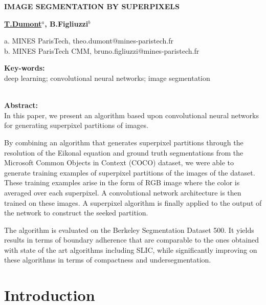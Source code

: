 \documentclass{article}
\begin{document}
\begin{center}
    \begin{Large}\textbf{IMAGE SEGMENTATION BY SUPERPIXELS}\end{Large}

    \vspace{1cm}
    \begin{large}\textbf{\underline{T.Dumont$^a$}, B.Figliuzzi$^b$}\end{large}

    \vspace{0.5cm}
    a. MINES ParisTech, theo.dumont@mines-paristech.fr\\
    b. MINES ParisTech CMM, bruno.figliuzzi@mines-paristech.fr
    \vspace{1cm}
\end{center}

\begin{center}

\noindent\textbf{Key-words: }\\
deep learning; convolutional neural networks; image segmentation\\
\ \\
\end{center}
\textbf{Abstract: }\\
In this paper, we present an algorithm based upon convolutional neural networks for generating superpixel partitions of images.
\par
By combining an algorithm that generates superpixel partitions through the resolution of the Eikonal equation and ground truth segmentations from the Microsoft Common Objects in Context (COCO) dataset, we were able to generate training examples of superpixel partitions of the images of the dataset. These training examples arise in the form of RGB image where the color is averaged over each superpixel. A convolutional network architecture is then trained on these images. A superpixel algorithm is finally applied to the output of the network to construct the seeked partition.
\par
The algorithm is evaluated on the Berkeley Segmentation Dataset 500. It yields results in terms of boundary adherence that are comparable to the ones obtained with state of the art algorithms including SLIC, while significantly improving on these algorithms in terms of compactness and undersegmentation.

\section{Introduction}
\end{document}
